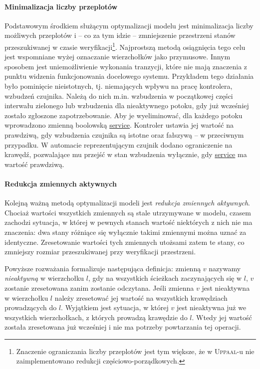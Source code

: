 \documentclass{pracamgr}
\newcommand{\upp}{\textsc{Uppaal}}
\theoremstyle{plain}
\begin{document}
\paragraph{Minimalizacja liczby przeplotów} Podstawowym środkiem
służącym optymalizacji modelu jest minimalizacja liczby możliwych
przeplotów i -- co za tym idzie -- zmniejszenie przestrzeni stanów
przeszukiwanej w czasie weryfikacji\footnote{Znaczenie ograniczania
  liczby przeplotów jest tym większe, że w \upp-u nie zaimplementowano
  redukcji częściowo-porządkowych.}. Najprostszą metodą osiągnięcia
tego celu jest wspomniane wyżej oznaczanie wierzchołków jako przymusowe.
Innym sposobem jest uniemożliwienie wykonania tranzycji, które nie
mają znaczenia z punktu widzenia funkcjonowania docelowego
systemu. Przykładem tego działania było pominięcie nieistotnych,
tj. niemających wpływu na pracę kontrolera, wzbudzeń czujnika. Należą
do nich m.in. wzbudzenia w początkowej części interwału zielonego lub
wzbudzenia dla nieaktywnego potoku, gdy już wcześniej zostało
zgłoszone zapotrzebowanie. Aby je wyeliminować, dla każdego potoku
wprowadzono zmienną boolowską \url{service}. Kontroler ustawia
jej wartość na prawdziwą, gdy wzbudzenia czujnika są istotne oraz
fałszywą -- w przeciwnym przypadku. W automacie reprezentującym
czujnik dodano ograniczenie na krawędź, pozwalające mu przejść w stan
wzbudzenia wyłącznie, gdy \url{service} ma wartość prawdziwą.

\paragraph{Redukcja zmiennych aktywnych} Kolejną ważną metodą
optymalizacji modeli jest \emph{redukcja zmiennych aktywnych}.
Chociaż wartości wszystkich zmiennych są stale utrzymywane w modelu,
czasem zachodzi sytuacja, w której w pewnych stanach wartość
niektórych z nich nie ma znaczenia: dwa stany różniące się wyłącznie
takimi zmiennymi można uznać za identyczne. Zresetowanie wartości tych
zmiennych utożsami zatem te stany, co zmniejszy rozmiar przeszukiwanej
przy weryfikacji przestrzeni.

Powyższe rozważania formalizuje następująca definicja: zmienną $v$
nazywamy \emph{nieaktywną} w wierzchołku $l$, gdy na wszystkich
ścieżkach zaczynających się w $l$, $v$ zostanie zresetowana zanim
zostanie odczytana. Jeśli zmienna $v$ jest nieaktywna w wierzchołku
$l$ należy zresetować jej wartość na wszystkich krawędziach
prowadzących do $l$. Wyjątkiem jest sytuacja, w której $v$ jest
nieaktywna już we wszystkich wierzchołkach, z których prowadzą
krawędzie do $l$. Wtedy jej wartość została zresetowana już wcześniej
i nie ma potrzeby powtarzania tej operacji.
\end{document}

